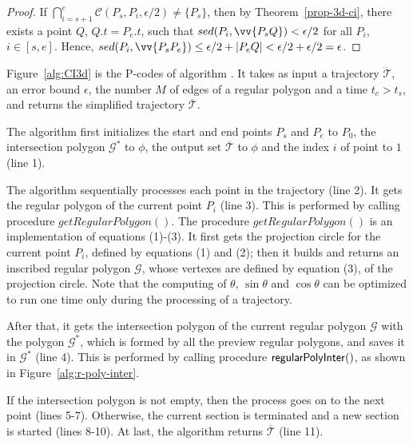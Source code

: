 \begin{proof}
If $\bigcap_{i=s+1}^{e}{\mathcal{C}(P_s, P_i, \epsilon/2)} \ne \{P_s\}$, then by Theorem~\ref{prop-3d-ci}, there exists a point $Q$, $Q.t = P_e.t$, such that $sed(P_i, \vv{P_sQ})<\epsilon/2$ for all $P_i$, $i \in [s,e]$. Hence, $sed(P_i, \vv{P_sP_e})\le \epsilon/2 + |P_eQ| < \epsilon/2 + \epsilon/2 = \epsilon$.
\end{proof}



Figure~\ref{alg:CI3d} is the P-codes of algorithm \cist. It takes as input a trajectory $\dddot{\mathcal{T}}$, an error bound $\epsilon$, the number $M$ of edges of a regular polygon and a time $t_c>t_s$, and returns the simplified trajectory $\overline{\mathcal{T}}$.

The algorithm first initializes the start and end points $P_s$ and $P_e$ to $P_0$, the intersection polygon $\mathcal{G}^*$ to $\phi$, the output set $\overline{\mathcal{T}}$ to $\phi$ and the index $i$ of point to $1$ (line 1).

The algorithm sequentially processes each point in the trajectory (line 2).
It gets the regular polygon of the current point $P_i$ (line 3).
This is performed by calling procedure $getRegularPolygon()$. The procedure $getRegularPolygon()$ is an implementation of equations (1)-(3). It first gets the projection circle for the current point $P_i$, defined by equations (1) and (2); then it builds and returns an inscribed regular polygon $\mathcal{G}$, whose vertexes are defined by equation (3), of the projection circle.
Note that the computing of $\theta$, $\sin\theta$ and $\cos\theta$ can be optimized to run one time only during the processing of a trajectory.

After that, it gets the intersection polygon of the current regular polygon $\mathcal{G}$ with the polygon $\mathcal{G}^*$, which is formed by all the preview regular polygons, and saves it in $\mathcal{G}^*$ (line 4).
This is performed by calling procedure ${\mathsf{regularPolyInter}}()$, as shown in Figure~\ref{alg:r-poly-inter}.

If the intersection polygon is not empty, then the process goes on to the next point (lines 5-7).
Otherwise, the current section is terminated and a new section is started (lines 8-10).
%
At last, the algorithm returns $\overline{\mathcal{T}}$ (line 11).


